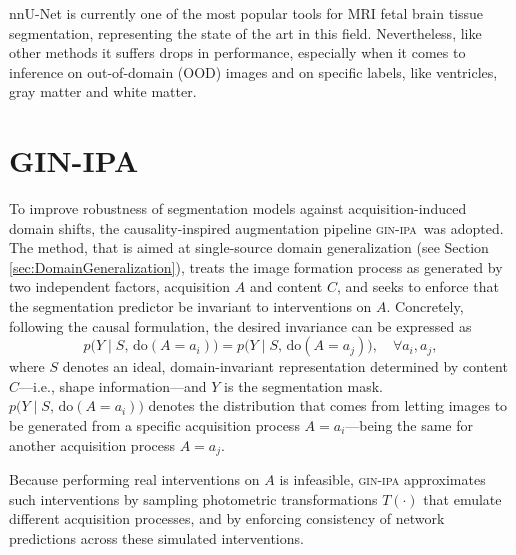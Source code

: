 nnU-Net is currently one of the most popular tools for MRI fetal brain tissue segmentation, representing the state of the art in this field. Nevertheless, like other methods it suffers drops in performance, especially when it comes to inference on out-of-domain (OOD) images and on specific labels, like ventricles, gray matter and white matter.

\section{GIN-IPA} \label{sec:gin-ipa}
To improve robustness of segmentation models against acquisition-induced domain shifts, the causality-inspired augmentation pipeline \textsc{gin-ipa}\,\cite{Ouyang2023} was adopted. The method, that is aimed at single-source domain generalization (see Section \ref{sec:DomainGeneralization}), treats the image formation process as generated by two independent factors, acquisition $A$ and content $C$, and seeks to enforce that the segmentation predictor be invariant to interventions on $A$. Concretely, following the causal formulation, the desired invariance can be expressed as
\begin{equation}\label{eq:domain-inv}
    p\bigl(Y\mid S,\,\mathrm{do}(A= a_i)\bigr) 
    = p\bigl(Y\mid S,\,\mathrm{do}(A= a_j)\bigr), \quad \forall a_i,a_j,
\end{equation}
where $S$ denotes an ideal, domain-invariant representation determined by content $C$---i.e., shape information---and $Y$ is the segmentation mask. $p\bigl(Y\mid S,\,\mathrm{do}(A= a_i)\bigr)$ denotes the distribution that comes from letting images to be generated from a specific acquisition process $A = a_i$---being the same for another acquisition process $A = a_j$.

Because performing real interventions on $A$ is infeasible, \textsc{gin-ipa} approximates such interventions by sampling photometric transformations $T(\cdot)$ that emulate different acquisition processes, and by enforcing consistency of network predictions across these simulated interventions.


